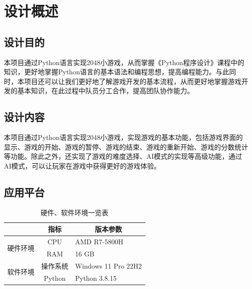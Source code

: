 \documentclass[UTF8,AutoFakeBold,AutoFakeSlant,zihao=-4]{ctexart}
\begin{document}



\newpage
\tableofcontents


\pagestyle{fancy}
\setcounter{page}{1}
\fancyhf{}
\fancyhead[R]{\fontsize{10.5pt}{10.5pt}\selectfont{西北工业大学课程设计（大作业）报告}}
\fancyfoot[R]{\fontsize{9pt}{9pt}\selectfont{\thepage}}
\renewcommand{\headrulewidth}{1pt}
\renewcommand{\footrulewidth}{0pt}

\setlength{\parskip}{0em}
\renewcommand{\baselinestretch}{1.53}
\setlength{\parindent}{1.02cm}

\section{设计概述}
\subsection{设计目的}
本项目通过Python语言实现2048小游戏，从而掌握《Python程序设计》课程中的知识，更好地掌握Python语言的基本语法和编程思想，提高编程能力。与此同时，本项目还可以让我们更好地了解游戏开发的基本流程，从而更好地掌握游戏开发的基本知识，在此过程中队员分工合作，提高团队协作能力。


\subsection{设计内容}
本项目通过Python语言实现2048小游戏，实现游戏的基本功能，包括游戏界面的显示、游戏的开始、游戏的暂停、游戏的结束、游戏的重新开始、游戏的分数统计等功能。除此之外，还实现了游戏的难度选择、AI模式的实现等高级功能，通过AI模式，可以让玩家在游戏中获得更好的游戏体验。

\subsection{应用平台}
\begin{table}[H]
  \centering
  \caption{硬件、软件环境一览表}
  \label{tab:soft-hardware}
  \begin{tabular}{@{}lcl@{}}
    \toprule
                              & 指标     & \multicolumn{1}{c}{版本参数} \\ \midrule
    \multirow{2}{*}{硬件环境} & CPU      & AMD R7-5800H               \\ \cmidrule(l){2-3}
                              & RAM      & 16 GB                         \\ \midrule
    \multirow{2}{*}{软件环境} & 操作系统 & Windows 11 Pro 22H2 \\ \cmidrule(l){2-3}
                              & Python   & Python 3.8.15                 \\ \bottomrule
  \end{tabular}
\end{table}
\end{document}
